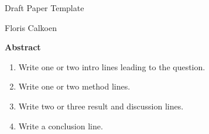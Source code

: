 \thispagestyle{plain}
\begin{center}
    \huge
    Draft Paper Template
    \vspace{0.5cm}
    \LARGE

    \vspace{0.5cm}

    \large
    Floris Calkoen

    \vspace{0.5cm}

    \vspace{0.5cm}

    \date{\today}

    \vspace{1.5cm}
    \textbf{Abstract}
\end{center}

\begin{enumerate}
    \item Write one or two intro lines leading to the question.
    \item Write one or two method lines.
    \item Write two or three result and discussion lines.
    \item Write a conclusion line.
\end{enumerate}

